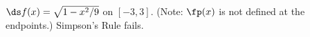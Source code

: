 {$\ds f(x) = \sqrt{1-x^2/9}$ on $[-3, 3]$. (Note: $\fp(x)$ is not defined at the endpoints.)}
{Simpson's Rule fails.}
